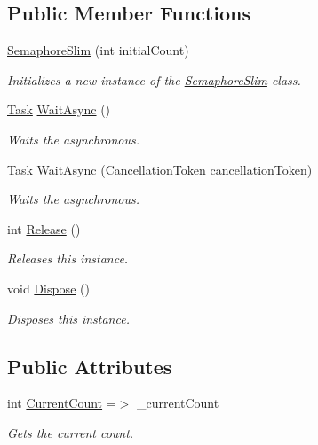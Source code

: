 \subsection*{Public Member Functions}
\begin{DoxyCompactItemize}
\item 
\hyperlink{class_system_1_1_threading_1_1_semaphore_slim_a159791eab1acdede5135bfd5befdd6b7}{Semaphore\+Slim} (int initial\+Count)
\begin{DoxyCompactList}\small\item\em Initializes a new instance of the \hyperlink{class_system_1_1_threading_1_1_semaphore_slim}{Semaphore\+Slim} class. \end{DoxyCompactList}\item 
\hyperlink{class_system_1_1_threading_1_1_tasks_1_1_task}{Task} \hyperlink{class_system_1_1_threading_1_1_semaphore_slim_a65e8b6755086cbcb88fcdc5758a33a55}{Wait\+Async} ()
\begin{DoxyCompactList}\small\item\em Waits the asynchronous. \end{DoxyCompactList}\item 
\hyperlink{class_system_1_1_threading_1_1_tasks_1_1_task}{Task} \hyperlink{class_system_1_1_threading_1_1_semaphore_slim_ad029e67589b38d997fea0b301c26ac11}{Wait\+Async} (\hyperlink{struct_system_1_1_threading_1_1_cancellation_token}{Cancellation\+Token} cancellation\+Token)
\begin{DoxyCompactList}\small\item\em Waits the asynchronous. \end{DoxyCompactList}\item 
int \hyperlink{class_system_1_1_threading_1_1_semaphore_slim_a0d5381112bb1ee977c693f4730d38f03}{Release} ()
\begin{DoxyCompactList}\small\item\em Releases this instance. \end{DoxyCompactList}\item 
void \hyperlink{class_system_1_1_threading_1_1_semaphore_slim_a4ae552cd56b642eeb53c4cfa864663a3}{Dispose} ()
\begin{DoxyCompactList}\small\item\em Disposes this instance. \end{DoxyCompactList}\end{DoxyCompactItemize}
\subsection*{Public Attributes}
\begin{DoxyCompactItemize}
\item 
int \hyperlink{class_system_1_1_threading_1_1_semaphore_slim_a508beacf8ec7d0e5fc983a0aca4dacdb}{Current\+Count} =$>$ \+\_\+current\+Count
\begin{DoxyCompactList}\small\item\em Gets the current count. \end{DoxyCompactList}\end{DoxyCompactItemize}


